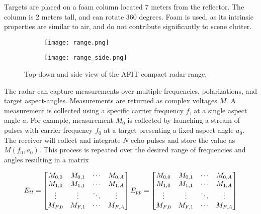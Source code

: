   Targets are placed on a foam column located 7 meters from the reflector. The column is 2 meters tall, and can rotate 360 degrees. Foam is used, as its intrinsic properties are similar to air, and do not contribute significantly to scene clutter.

  \begin{figure}[htbp]
    \centering
    \begin{subfigure}{.5\textwidth}
      \centering
      \texttt{[image: range.png]}
    \end{subfigure}%
    \begin{subfigure}{.5\textwidth}
      \centering
      \texttt{[image: range\_side.png]}
    \end{subfigure}
    \caption[AFIT Compact Range Schematic]{Top-down and side view of the AFIT compact radar range.}
    \label{fig:range}
  \end{figure}

  The radar can capture measurements over multiple frequencies, polarizations, and target aspect-angles. Measurements are returned as complex voltages $M$. A measurement is collected using a specific carrier frequency $f$, at a single aspect angle $a$. For example, measurement $M_0$ is collected by launching a stream of pulses with carrier frequency $f_0$ at a target presenting a fixed aspect angle $a_0$. The receiver will collect and integrate $N$ echo pulses and store the value as $M(f_0, a_0)$. This process is repeated over the desired range of frequencies and angles resulting in a matrix

  \begin{equation}\label{eq:RCS_mat}
    E_{tt} =
     \begin{bmatrix}
       M_{0,0} & M_{0,1} & \cdots & M_{0,A} \\
       M_{1,0} & M_{1,1} & \cdots & M_{1,A} \\
       \vdots  & \vdots  & \ddots & \vdots  \\
       M_{F,0} & M_{F,1} & \cdots & M_{F,A}
     \end{bmatrix}
     \\
     E_{pp} =
      \begin{bmatrix}
      M_{0,0} & M_{0,1} & \cdots & M_{0,A} \\
      M_{1,0} & M_{1,1} & \cdots & M_{1,A} \\
      \vdots  & \vdots  & \ddots & \vdots  \\
      M_{F,0} & M_{F,1} & \cdots & M_{F,A}
      \end{bmatrix}
  \end{equation}

